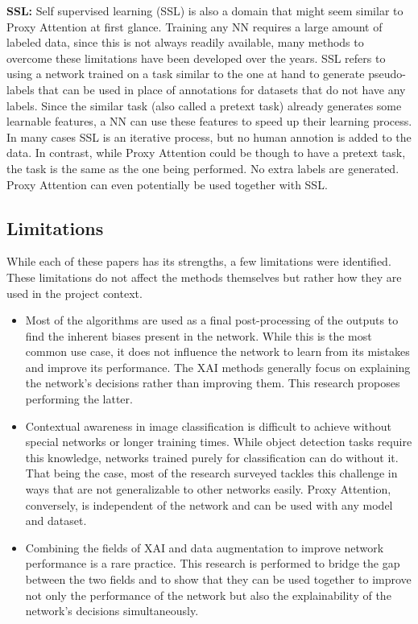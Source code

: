 \textbf{SSL: }
Self supervised learning (SSL) is also a domain that might seem similar to Proxy Attention at first glance. Training any NN requires a large amount of labeled data, since this is not always readily available, many methods to overcome these limitations have been developed over the years. SSL refers to using a network trained on a task similar to the one at hand to generate pseudo-labels that can be used in place of annotations for datasets that do not have any labels. Since the similar task (also called a pretext task) already generates some learnable features, a NN can use these features to speed up their learning process. In many cases SSL is an iterative process, but no human annotion is added to the data. 
In contrast, while Proxy Attention could be though to have a pretext task, the task is the same as the one being performed. No extra labels are generated. Proxy Attention can even potentially be used together with SSL.

\subsection{Limitations}
While each of these papers has its strengths, a few limitations were identified. These limitations do not affect the methods themselves but rather how they are used in the project context.
\begin{itemize}
    \item Most of the algorithms are used as a final post-processing of the outputs to find the inherent biases present in the network. While this is the most common use case, it does not influence the network to learn from its mistakes and improve its performance. The XAI methods generally focus on explaining the network's decisions rather than improving them. This research proposes performing the latter.
    \item Contextual awareness in image classification is difficult to achieve without special networks or longer training times. While object detection tasks require this knowledge, networks trained purely for classification can do without it. That being the case, most of the research surveyed tackles this challenge in ways that are not generalizable to other networks easily. Proxy Attention, conversely, is independent of the network and can be used with any model and dataset. 
    \item Combining the fields of XAI and data augmentation to improve network performance is a rare practice. This research is performed to bridge the gap between the two fields and to show that they can be used together to improve not only the performance of the network but also the explainability of the network's decisions simultaneously.

\end{itemize}